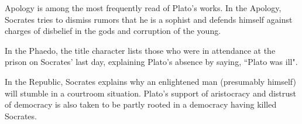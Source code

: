 \documentclass[11pt]{article}
\begin{document}
		\begin{description}[align=left]
			\item[Apology] Apology is among the most frequently read of Plato's works. In the Apology, Socrates tries to dismiss rumors that he is a sophist and defends himself against charges of disbelief in the gods and corruption of the young.
			\item[Phaedo] In the Phaedo, the title character lists those who were in attendance at the prison on Socrates' last day, explaining Plato's absence by saying, ``Plato was ill".
			\item[Republic] In the Republic, Socrates explains why an enlightened man (presumably himself) will stumble in a courtroom situation. Plato's support of aristocracy and distrust of democracy is also taken to be partly rooted in a democracy having killed Socrates.
		\end{description}
\end{document}
